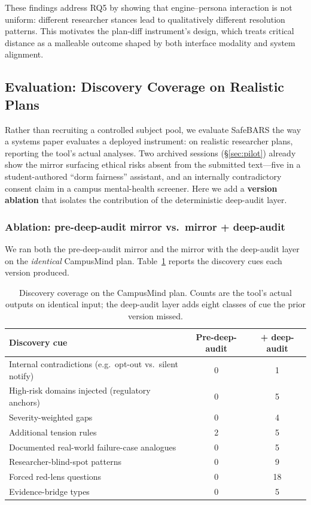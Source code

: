 \documentclass[sigconf,screen]{acmart}
\begin{document}
These findings address RQ5 by showing that engine--persona interaction is not
uniform: different researcher stances lead to qualitatively different
resolution patterns. This motivates the plan-diff instrument's design, which treats
critical distance as a malleable outcome shaped by both interface modality and
system alignment.


\subsection{Evaluation: Discovery Coverage on Realistic Plans}
\label{sec:eval}

Rather than recruiting a controlled subject pool, we evaluate SafeBARS the way
a systems paper evaluates a deployed instrument: on realistic researcher
plans, reporting the tool's actual analyses. Two archived sessions
(\S\ref{sec:pilot}) already show the mirror surfacing ethical risks absent
from the submitted text---five in a student-authored ``dorm fairness''
assistant, and an internally contradictory consent claim in a campus
mental-health screener. Here we add a \textbf{version ablation} that isolates
the contribution of the deterministic deep-audit layer.

\subsubsection{Ablation: pre-deep-audit mirror vs.\ mirror + deep-audit}
\label{sec:ablation}
We ran both the pre-deep-audit mirror and the mirror with the deep-audit layer
on the \emph{identical} CampusMind plan. Table~\ref{tab:ablation} reports the
discovery cues each version produced.

\begin{table}[t]
  \centering
  \caption{Discovery coverage on the CampusMind plan. Counts are the tool's
  actual outputs on identical input; the deep-audit layer adds eight classes
  of cue the prior version missed.}
  \label{tab:ablation}
  \begin{tabular}{p{}cc}
    \toprule
    Discovery cue & Pre-deep-audit & + deep-audit \\
    \midrule
    Internal contradictions (e.g.\ opt-out vs.\ silent notify) & 0 & 1 \\
    High-risk domains injected (regulatory anchors) & 0 & 5 \\
    Severity-weighted gaps & 0 & 4 \\
    Additional tension rules & 2 & 5 \\
    Documented real-world failure-case analogues & 0 & 5 \\
    Researcher-blind-spot patterns & 0 & 9 \\
    Forced red-lens questions & 0 & 18 \\
    Evidence-bridge types & 0 & 5 \\
    \bottomrule
  \end{tabular}
\end{table}
\end{document}

